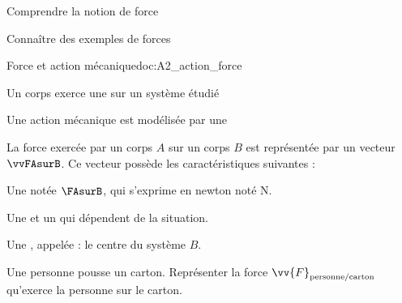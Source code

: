 \teteSndMouv


\vspace*{-32pt}


\begin{objectifs}
  \item Comprendre la notion de force
  \item Connaître des exemples de forces
\end{objectifs}

\begin{doc}{Force et action mécanique}{doc:A2_action_force}
  \begin{importants}  
    Un corps exerce une  sur un système étudié 
  \end{importants}
  
  Une action mécanique est modélisée par une 

  \begin{importants}
    La force exercée par un corps $A$ sur un corps $B$ est représentée par un vecteur $\vvFAsurB$.
    Ce vecteur possède les caractéristiques suivantes :
    \begin{listePoints}
      \item Une  notée $\FAsurB$, qui s'exprime en newton noté \unit{\newton}.
      \item Une  et un  qui dépendent de la situation.
      \item Une , appelée  : le centre du système $B$.
    \end{listePoints}
  \end{importants}
\end{doc}

\mesure
Une personne pousse un carton. 
Représenter la force $\vv{F}_\text{personne/carton}$ qu'exerce la personne sur le carton.

\vspace*{-8pt}
\begin{center}
\end{center}


